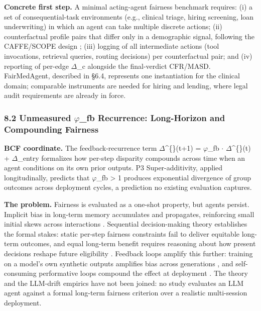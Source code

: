 \documentclass[10pt]{article}
\begin{document}
\textbf{Concrete first step.} A minimal acting-agent fairness benchmark requires: (i) a set of consequential-task environments (e.g., clinical triage, hiring screening, loan underwriting) in which an agent can take multiple discrete actions; (ii) counterfactual profile pairs that differ only in a demographic signal, following the CAFFE/SCOPE design \cite{parziale2025systematic,parziale2026scope}; (iii) logging of all intermediate actions (tool invocations, retrieval queries, routing decisions) per counterfactual pair; and (iv) reporting of per-edge $\Delta$\_c alongside the final-verdict CFR/MASD. FairMedAgent, described in \S{}6.4, represents one instantiation for the clinical domain; comparable instruments are needed for hiring and lending, where legal audit requirements are already in force.

\subsubsection*{8.2 Unmeasured $\varphi$\_fb Recurrence: Long-Horizon and Compounding Fairness}

\textbf{BCF coordinate.} The feedback-recurrence term $\Delta$\textasciicircum\{\}(t+1) = $\varphi$\_fb $\cdot$ $\Delta$\textasciicircum\{\}(t) + $\Delta$\_entry formalizes how per-step disparity compounds across time when an agent conditions on its own prior outputs. P3 Super-additivity, applied longitudinally, predicts that $\varphi$\_fb > 1 produces exponential divergence of group outcomes across deployment cycles, a prediction no existing evaluation captures.

\textbf{The problem.} Fairness is evaluated as a one-shot property, but agents persist. Implicit bias in long-term memory accumulates and propagates, reinforcing small initial skews across interactions \cite{ma2026implicit}. Sequential decision-making theory establishes the formal stakes: static per-step fairness constraints fail to deliver equitable long-term outcomes, and equal long-term benefit requires reasoning about how present decisions reshape future eligibility \cite{hu2022achieving,xu2024adapting}. Feedback loops amplify this further: training on a model's own synthetic outputs amplifies bias across generations \cite{wyllie2024fairness}, and self-consuming performative loops compound the effect at deployment \cite{wang2026observations}. The theory and the LLM-drift empirics \cite{fan2024fairmt,ma2026implicit,liu2025truth} have not been joined: no study evaluates an LLM agent against a formal long-term fairness criterion over a realistic multi-session deployment.
\end{document}
